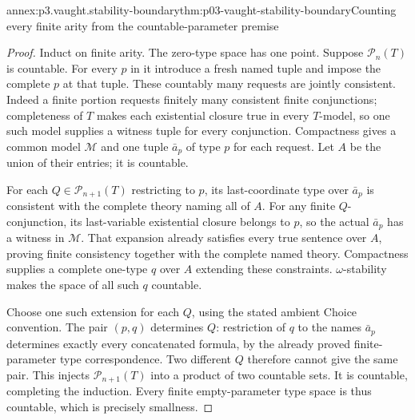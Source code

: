 \begin{annexitem}{annex:p3.vaught.stability-boundary}{thm:p03-vaught-stability-boundary}{Counting every finite arity from the countable-parameter premise}
\begin{proof}
Induct on finite arity. The zero-type space has one point.
Suppose \(\mathcal P_n(T)\) is countable.
For every \(p\) in it introduce a fresh named tuple and impose
the complete \(p\) at that tuple. These countably many requests
are jointly consistent. Indeed a finite portion requests finitely
many consistent finite conjunctions; completeness of \(T\) makes
each existential closure true in every \(T\)-model, so one such
model supplies a witness tuple for every conjunction.
Compactness gives a common model \(\mathcal M\) and one tuple
\(\bar a_p\) of type \(p\) for each request.
Let \(A\) be the union of their entries; it is countable.

For each \(Q\in\mathcal P_{n+1}(T)\) restricting to \(p\), its
last-coordinate type over \(\bar a_p\) is consistent with the
complete theory naming all of \(A\).
For any finite \(Q\)-conjunction, its last-variable existential
closure belongs to \(p\), so the actual \(\bar a_p\) has a witness
in \(\mathcal M\). That expansion already satisfies every true
sentence over \(A\), proving finite consistency together with
the complete named theory. Compactness supplies a complete
one-type \(q\) over \(A\) extending these constraints.
\(\omega\)-stability makes the space of all such \(q\) countable.

Choose one such extension for each \(Q\), using the stated ambient
Choice convention. The pair \((p,q)\) determines \(Q\): restriction
of \(q\) to the names \(\bar a_p\) determines exactly every
concatenated formula, by the already proved finite-parameter
type correspondence. Two different \(Q\) therefore cannot give
the same pair. This injects \(\mathcal P_{n+1}(T)\) into a product
of two countable sets. It is countable, completing the induction.
Every finite empty-parameter type space is thus countable,
which is precisely smallness.
\end{proof}
\end{annexitem}

